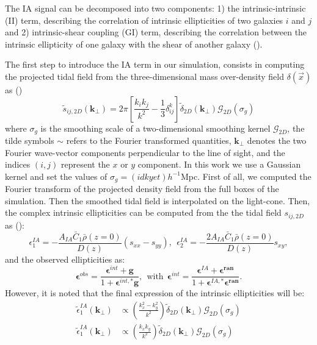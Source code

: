 \documentclass[twocolumn,twocolappendix]{aastex63}
\begin{document}
The IA signal can be decomposed into two components: 1) the intrinsic-intrinsic (II) term, describing the correlation of intrinsic ellipticities of two galaxies $i$ and $j$ and 2) intrinsic-shear coupling (GI) term, describing the correlation between the intrinsic ellipticity of one galaxy with the shear of another galaxy (\cite{kilbinger2015cosmology}).

The first step to introduce the IA term in our simulation, consists in computing the projected tidal field from the three-dimensional mass over-density field $\delta(\vec{x})$
as (\cite{harnois2021cosmic})
\begin{equation}
   \tilde{s}_{ij,2D}(\textbf{k}_{\bot})=
   2 \pi 	\left [ \frac{k_ik_j}{k^2}- \frac{1}{3} \delta_{ij}^k  \right ]
  \tilde{\delta}_{2D}(\textbf{k}_{\bot})
   \mathcal{G}_{2D}(\sigma_g)
\end{equation}
where $\sigma_g$ is the smoothing scale of a two-dimensional smoothing kernel $\mathcal{G}_{2D}$, the tilde symbols $\sim $ refers to the Fourier transformed quantities, $\textbf{k}_{\bot}$ denotes the two Fourier wave-vector components perpendicular to the line of sight, and the indices $(i,j)$ represent the $x$ or $y$ component.
In this work we use a Gaussian kernel and set the values of $\sigma_g=(idk yet) h^{-1}$Mpc.
First of all, we computed the Fourier transform of the projected density field from the full boxes of the simulation. 
Then the smoothed tidal field is interpolated on the light-cone. 
Then, the complex intrinsic ellipticities can be computed from the the tidal field $s_{ij,2D}$ as (\cite{harnois2021cosmic}):
\begin{equation}\label{complex_el}
    \epsilon_{1}^{IA}=- \frac{A_{IA}\bar{C}_1\bar{\rho}(z=0)}{D(z)} (s_{xx}-s_{yy}), \ \ 
      \epsilon_{2}^{IA}=-\frac{2A_{IA}\bar{C}_1\bar{\rho}(z=0)}{D(z)} s_{xy},
\end{equation}
and the observed ellipticities as:
\begin{equation}
    \boldsymbol{\epsilon}^{obs}=
    \frac{\boldsymbol{\epsilon}^{int}+\textbf{g}}{1+\boldsymbol{\epsilon}^{int,*}\textbf{g}}, \ \  \text{with}  \ \
    \boldsymbol{\epsilon}^{int}=
    \frac{\boldsymbol{\epsilon}^{
     IA}+\boldsymbol{\epsilon^{ran}}}
     {1+\boldsymbol{\epsilon}^{IA,*}\boldsymbol{\epsilon^{ran}}}.
\end{equation}
However, it is noted that the final expression of the intrinsic ellipticities will be:
\begin{align}
    \tilde{ \epsilon}_{1}^{IA}(\textbf{k}_{\bot}) & \propto
    \left ( \frac{k_x^2-k_y^2}{k^2} \right )  \tilde{\delta}_{2D}(\textbf{k}_{\bot})
   \mathcal{G}_{2D}(\sigma_g) \\
       \tilde{ \epsilon}_{1}^{IA}(\textbf{k}_{\bot}) & \propto
    \left ( \frac{k_x k_y}{k^2} \right )  \tilde{\delta}_{2D}(\textbf{k}_{\bot})
   \mathcal{G}_{2D}(\sigma_g) \nonumber
\end{align}
\end{document}
